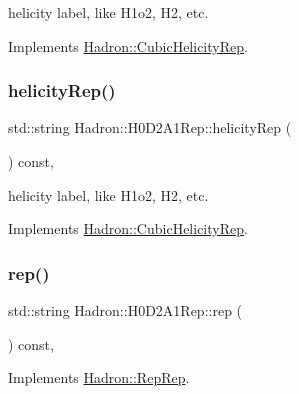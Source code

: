 helicity label, like H1o2, H2, etc. 

Implements \mbox{\hyperlink{structHadron_1_1CubicHelicityRep_af1096946b7470edf0a55451cc662f231}{Hadron\+::\+Cubic\+Helicity\+Rep}}.

\mbox{\label{structHadron_1_1H0D2A1Rep_ae0a667c77e5bdd60a1225ac10f4e1247}} 
\subsubsection{\texorpdfstring{helicityRep()}{helicityRep()}\hspace{0.1cm}{\footnotesize\ttfamily [2/2]}}
{\footnotesize\ttfamily std\+::string Hadron\+::\+H0\+D2\+A1\+Rep\+::helicity\+Rep (\begin{DoxyParamCaption}{ }\end{DoxyParamCaption}) const\hspace{0.3cm}{\ttfamily [inline]}, {\ttfamily [virtual]}}

helicity label, like H1o2, H2, etc. 

Implements \mbox{\hyperlink{structHadron_1_1CubicHelicityRep_af1096946b7470edf0a55451cc662f231}{Hadron\+::\+Cubic\+Helicity\+Rep}}.

\mbox{\label{structHadron_1_1H0D2A1Rep_ac7e30eadba7f3a5049f2bde305ca28c5}} 
\subsubsection{\texorpdfstring{rep()}{rep()}\hspace{0.1cm}{\footnotesize\ttfamily [1/3]}}
{\footnotesize\ttfamily std\+::string Hadron\+::\+H0\+D2\+A1\+Rep\+::rep (\begin{DoxyParamCaption}{ }\end{DoxyParamCaption}) const\hspace{0.3cm}{\ttfamily [inline]}, {\ttfamily [virtual]}}



Implements \mbox{\hyperlink{structHadron_1_1RepRep_ab3213025f6de249f7095892109575fde}{Hadron\+::\+Rep\+Rep}}.

\mbox{\label{structHadron_1_1H0D2A1Rep_ac7e30eadba7f3a5049f2bde305ca28c5}} 
